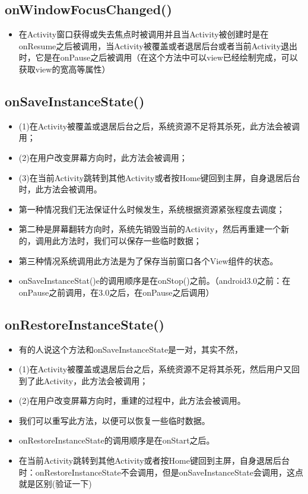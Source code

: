 \documentclass[9pt, b5paaper]{book}
\begin{document}
\subsection{onWindowFocusChanged()}
\label{sec-1-3-1}
\begin{itemize}
\item 在Activity窗口获得或失去焦点时被调用并且当Activity被创建时是在onResume之后被调用，当Activity被覆盖或者退居后台或者当前Activity退出时，它是在onPause之后被调用（在这个方法中可以view已经绘制完成，可以获取view的宽高等属性）
\end{itemize}
\subsection{onSaveInstanceState()}
\label{sec-1-3-2}
\begin{itemize}
\item (1)在Activity被覆盖或退居后台之后，系统资源不足将其杀死，此方法会被调用；
\item (2)在用户改变屏幕方向时，此方法会被调用；
\item (3)在当前Activity跳转到其他Activity或者按Home键回到主屏，自身退居后台时，此方法会被调用。
\item 第一种情况我们无法保证什么时候发生，系统根据资源紧张程度去调度；
\item 第二种是屏幕翻转方向时，系统先销毁当前的Activity，然后再重建一个新的，调用此方法时，我们可以保存一些临时数据；
\item 第三种情况系统调用此方法是为了保存当前窗口各个View组件的状态。
\item onSaveInstanceStat()e的调用顺序是在onStop()之前。（android3.0之前：在onPause之前调用，在3.0之后，在onPause之后调用）
\end{itemize}
\subsection{onRestoreInstanceState()}
\label{sec-1-3-3}
\begin{itemize}
\item 有的人说这个方法和onSaveInstanceState是一对，其实不然，
\item (1)在Activity被覆盖或退居后台之后，系统资源不足将其杀死，然后用户又回到了此Activity，此方法会被调用；
\item (2)在用户改变屏幕方向时，重建的过程中，此方法会被调用。
\item 我们可以重写此方法，以便可以恢复一些临时数据。
\item onRestoreInstanceState的调用顺序是在onStart之后。
\item 在当前Activity跳转到其他Activity或者按Home键回到主屏，自身退居后台时：onRestoreInstanceState不会调用，但是onSaveInstanceState会调用，这点就是区别(验证一下)
\end{itemize}
\end{document}
